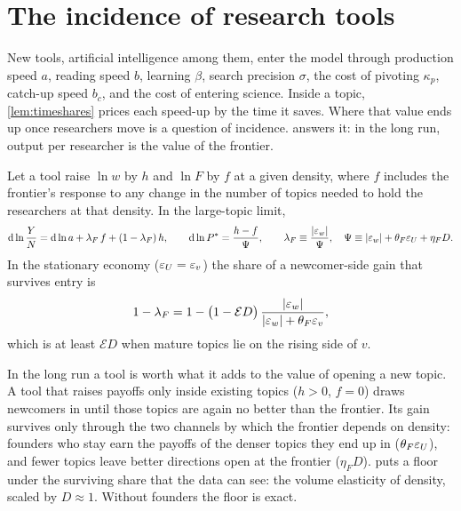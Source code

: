 \section{The incidence of research tools}\label{sec:ai}

New tools, artificial intelligence among them, enter the model through
production speed $a$, reading speed $b$, learning $\beta$, search precision
$\sigma$, the cost of pivoting $\kappa_p$, catch-up speed $b_c$, and the cost of
entering science. Inside a topic, \cref{lem:timeshares} prices each speed-up by
the time it saves. Where that value ends up once researchers move is a
question of incidence.  answers it: in the long run, output
per researcher is the value of the frontier.

\begin{theorem}\label{thm:incidence}
Let a tool raise $\ln w$ by $h$ and $\ln F$ by $f$ at a given density, where $f$
includes the frontier's response to any change in the number of topics needed
to hold the researchers at that density. In the large-topic limit,
\begin{equation}\label{eq:incidence}
\mathrm{d}\ln\frac YN=\mathrm{d}\ln a+\lambda_F\,f+(1-\lambda_F)\,h,\qquad
\mathrm{d}\ln P^*=\frac{h-f}{\Psi},\qquad
\lambda_F\equiv\frac{|\varepsilon_w|}{\Psi},\quad \Psi\equiv|\varepsilon_w|+\theta_F\varepsilon_U+\eta_FD.
\end{equation}
In the stationary economy ($\varepsilon_U=\varepsilon_v$) the share of a newcomer-side gain
that survives entry is
\begin{equation}\label{eq:passthrough}
1-\lambda_F=1-\big(1-\mathcal E D\big)\,\frac{|\varepsilon_w|}{|\varepsilon_w|+\theta_F\varepsilon_v},
\end{equation}
which is at least $\mathcal E D$ when mature topics lie on the rising side of $v$.
\end{theorem}

In the long run a tool is worth what it adds to the value of opening a new
topic. A tool that raises payoffs only inside existing topics ($h>0$, $f=0$)
draws newcomers in until those topics are again no better than the frontier.
Its gain survives only through the two channels by which the frontier depends
on density: founders who stay earn the payoffs of the denser topics they end
up in ($\theta_F\varepsilon_U$), and fewer topics leave better directions open at the
frontier ($\eta_FD$).  puts a floor under the surviving
share that the data can see: the volume elasticity of density, scaled by
$D\approx1$. Without founders the floor is exact.

